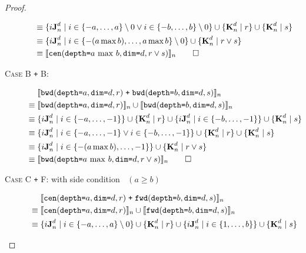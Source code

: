 \begin{proof}
\begin{description}
\begin{align*}
      \equiv & \; \{i\singleEntry{d}{n} \mid i \in \{-a, \ldots, a\} \setminus 0 \vee
                                             i \in \{-b, \ldots, b\} \setminus 0 \} \cup
                 \{\zeroEntry{d}{n} \mid r \} \cup \{\zeroEntry{d}{n} \mid s \} \\
      \equiv & \; \{i\singleEntry{d}{n} \mid i \in \{-(a \max b), \ldots, a \max b\} \setminus 0 \} \cup
                  \{\zeroEntry{d}{n} \mid r \vee s \}\\
      \equiv & \; \interp{\stenCenSR{a \, \max \, b}{d}{r \vee s}}_n \qed
    \end{align*}
  \item[\textsc{Case B \texttt{+} B}:]
    \begin{align*}
      & \; \interp{\stenBwdSR{a}{d}{r} \; \texttt{+} \; \stenBwdSR{b}{d}{s}}_{n} \\
      \equiv & \; \interp{\stenBwdSR{a}{d}{r}}_{n} \cup \interp{\stenBwdSR{b}{d}{s}}_{n} \\
      \equiv & \; \{i\singleEntry{d}{n} \mid i \in \{-a, \ldots, -1\} \} \cup
                  \{\zeroEntry{d}{n} \mid r \} \cup
                  \{i\singleEntry{d}{n} \mid i \in \{-b, \ldots, -1\} \} \cup
                  \{\zeroEntry{d}{n} \mid s \} \\
      \equiv & \; \{i\singleEntry{d}{n} \mid i \in \{-a, \ldots, -1\} \vee
                                             i \in \{-b, \ldots, -1\} \} \cup
                  \{\zeroEntry{d}{n} \mid r \} \cup \{\zeroEntry{d}{n} \mid s \} \\
      \equiv & \; \{i\singleEntry{d}{n} \mid i \in \{-(a \max b), \ldots, -1 \} \} \cup
                  \{\zeroEntry{d}{n} \mid r \vee s \}\\
      \equiv & \; \interp{\stenBwdSR{a \, \max \, b}{d}{r \vee s}}_n \qed
    \end{align*}
  \item[\textsc{Case C \texttt{+} F}: with side condition  $\;\;(a \geq b)$]
    \begin{align*}
      & \; \interp{\stenCenSR{a}{d}{r} \; \texttt{+} \; \stenFwdSR{b}{d}{s}}_{n} \\
      \equiv & \; \interp{\stenCenSR{a}{d}{r}}_{n} \cup \interp{\stenFwdSR{b}{d}{s}}_{n} \\
      \equiv & \; \{i\singleEntry{d}{n} \mid i \in \{-a, \ldots, a\} \setminus 0 \} \cup
                  \{\zeroEntry{d}{n} \mid r \} \cup
                  \{i\singleEntry{d}{n} \mid i \in \{1, \ldots, b\} \} \cup
                  \{\zeroEntry{d}{n} \mid s \} \\

\end{align*}
\end{description}
\end{proof}
